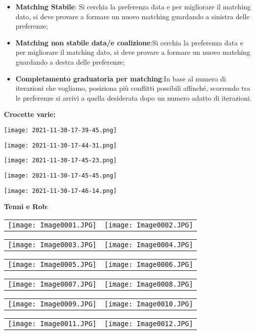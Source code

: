 \documentclass{article}
\theoremstyle{definition}
\theoremstyle{remark}
\begin{document}
\begin{itemize}
    \item \textbf{Matching Stabile}: Si cerchia la preferenza data e per migliorare il matching dato, si deve provare a formare un nuovo matching guardando a sinistra delle preferenze;
    \item \textbf{Matching non stabile data/e coalizione}:Si cerchia la preferenza data e per migliorare il matching dato, si deve provare a formare un nuovo matching guardando a destra delle preferenze;
    \item \textbf{Completamento graduatoria per matching}:In base al numero di iterazioni che vogliamo, posiziona più conflitti possibili affinché, scorrendo tra le preferenze si arrivi a quella desiderata
    dopo un numero adatto di iterazioni.
\end{itemize}
\newpage
\textbf{Crocette varie:}
\begin{center}
    \texttt{[image: 2021-11-30-17-39-45.png]}
\end{center}
\begin{center}
    \texttt{[image: 2021-11-30-17-44-31.png]}
\end{center}
\begin{center}
    \texttt{[image: 2021-11-30-17-45-23.png]}
\end{center}
\begin{center}
    \texttt{[image: 2021-11-30-17-45-45.png]}
\end{center}
\begin{center}
    \texttt{[image: 2021-11-30-17-46-14.png]}
\end{center}
\textbf{Tenni e Rob}:\newline
\begin{tabular}{cc}
        \texttt{[image: Image0001.JPG]}&
        \texttt{[image: Image0002.JPG]}
\end{tabular}
\begin{tabular}{cc}
    \texttt{[image: Image0003.JPG]}&
    \texttt{[image: Image0004.JPG]}
\end{tabular}
\begin{tabular}{cc}
    \texttt{[image: Image0005.JPG]}&
    \texttt{[image: Image0006.JPG]}
\end{tabular}
\begin{tabular}{cc}
    \texttt{[image: Image0007.JPG]}&
    \texttt{[image: Image0008.JPG]}
\end{tabular}
\begin{tabular}{cc}
    \texttt{[image: Image0009.JPG]}&
    \texttt{[image: Image0010.JPG]}
\end{tabular}
\begin{tabular}{cc}
    \texttt{[image: Image0011.JPG]}&
    \texttt{[image: Image0012.JPG]}
\end{tabular}
\end{document}
